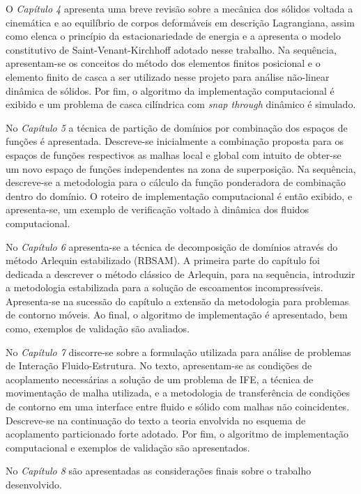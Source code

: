 O \textit{Capítulo 4} apresenta uma breve revisão sobre a mecânica dos sólidos voltada a cinemática e ao equilíbrio de corpos deformáveis em descrição Lagrangiana, assim como elenca o princípio da estacionariedade de energia e a apresenta o modelo constitutivo de Saint-Venant-Kirchhoff adotado nesse trabalho. Na sequência, apresentam-se os conceitos do método dos elementos finitos posicional e o elemento finito de casca a ser utilizado nesse projeto para análise não-linear dinâmica de sólidos. Por fim, o algoritmo da implementação computacional é exibido e um problema de casca cilíndrica com \textit{snap through} dinâmico é simulado.

No \textit{Capítulo 5} a técnica de partição de domínios por combinação dos espaços de funções é apresentada.  Descreve-se inicialmente a combinação proposta para os espaços de funções respectivos as malhas local e global com intuito de obter-se um novo espaço de funções independentes na zona de superposição. Na sequência, descreve-se a metodologia para o cálculo da função ponderadora de combinação dentro do domínio. O roteiro de implementação computacional é então exibido, e apresenta-se, um exemplo de verificação voltado à dinâmica dos fluidos computacional.

No \textit{Capítulo 6} apresenta-se a técnica de decomposição de domínios através do método Arlequin estabilizado (RBSAM). A primeira parte do capítulo foi dedicada a descrever o método clássico de Arlequin, para na sequência, introduzir a metodologia estabilizada para a solução de escoamentos incompressíveis. Apresenta-se na sucessão do capítulo a extensão da metodologia para problemas de contorno móveis. Ao final, o algoritmo de implementação é apresentado, bem como, exemplos de validação são avaliados.

No \textit{Capítulo 7} discorre-se sobre a formulação utilizada para análise de problemas de Interação Fluido-Estrutura. No texto, apresentam-se as condições de acoplamento necessárias a solução de um problema de IFE, a técnica de movimentação de malha utilizada, e a metodologia de transferência de condições de contorno em uma interface entre fluido e sólido com malhas não coincidentes. Descreve-se na continuação do texto a teoria envolvida no esquema de acoplamento particionado forte adotado. Por fim, o algoritmo de implementação computacional e exemplos de validação são apresentados.

No \textit{Capítulo 8} são apresentadas as considerações finais sobre o trabalho desenvolvido. 

